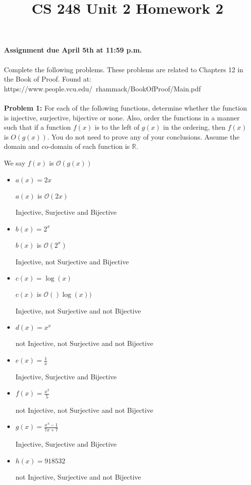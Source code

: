 \documentclass[12pt]{article}
\title{CS 248 Unit 2 Homework 2}
\def\R{\mathbb R} %
\begin{document}
\textbf{Assignment due April 5th at 11:59 p.m. \\ \\
}Complete the following problems. These problems are related to Chapters 12 in the Book of Proof. Found at: \\ https://www.people.vcu.edu/~rhammack/BookOfProof/Main.pdf \\ \\

{\bf Problem 1:} For each of the following functions, determine whether the function is injective, surjective, bijective or none. Also, order the functions in a manner such that if a function $f(x)$ is to the left of $g(x)$ in the ordering, then $f(x)$ is $O(g(x)).$ You do not need to prove any of your conclusions. Assume the domain and co-domain of each function is $\R$.

We say $f(x)$ is $\mathcal{O}(g(x))$
\begin{itemize}

    \item $a(x) = 2x$
    
    $a(x)$ is $\mathcal{O}(2x)$
    
    Injective, Surjective and Bijective

    \item $b(x) = 2^x$
    
    $b(x)$ is $\mathcal{O}(2^x)$
    
    Injective, not Surjective and Bijective

    \item $c(x) = \log(x)$
    
    $c(x)$ is $\mathcal{O}()\log(x))$
    
    Injective, not Surjective and not Bijective

    \item $d(x) = x^x$
    
    not Injective, not Surjective and not Bijective

    \item $e(x) = \frac{1}{x}$
    
    Injective, Surjective and Bijective

    \item $f(x) = \frac{x^2}{5}$
    
    not Injective, not Surjective and not Bijective

    \item $g(x) = \frac{x^4-1}{7x+7}$
    
    Injective, Surjective and Bijective

    \item $h(x) = 918532$
    
    not Injective, Surjective and not Bijective

\end{itemize} 
\end{document}
